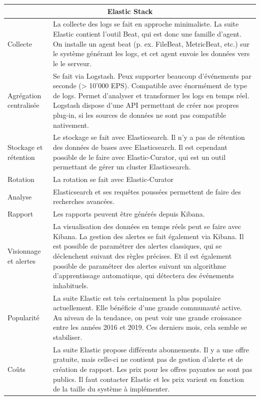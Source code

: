 \documentclass[paper=a4, fontsize=11pt]{scrartcl}
\begin{document}
\centering
\begin{tabular}{ |p{4cm}||p{12cm}|  }
    \hline
    \multicolumn{2}{|c|}{Elastic Stack} \\
    \hline
    Collecte & La collecte des logs se fait en approche minimaliste. La suite Elastic contient l'outil Beat, qui est donc une famille d'agent. On installe un agent beat (p. ex. FileBeat, MetricBeat, etc.) sur le système générant les logs, et cet agent envoie les données vers le le serveur.\\
    \hline
    Agrégation centralisée & Se fait via Logstash. Peux supporter beaucoup d'événements par seconde (> 10'000 EPS). Compatible avec énormément de type de logs. Permet d'analyser et transformer les logs en temps réel. Logstash dispose d'une API permettant de créer nos propres plug-in, si les sources de données ne sont pas compatible nativement.\\
    \hline
    Stockage et rétention & Le stockage se fait avec Elasticsearch. Il n'y a pas de rétention des données de bases avec Elasticsearch. Il est cependant possible de le faire avec Elastic-Curator, qui est un outil permettant de gérer un cluster Elasticsearch.\\
    \hline
    Rotation & La rotation se fait avec Elastic-Curator\\
    \hline
    Analyse & Elasticsearch et ses requêtes poussées permettent de faire des recherches avancées.\\
    \hline
    Rapport & Les rapports peuvent être générés depuis Kibana.\\
    \hline
    Visionnage et alertes & La visualisation des données en temps réels peut se faire avec Kibana. La gestion des alertes se fait également via Kibana. Il est possible de paramétrer des alertes classiques, qui se déclenchent suivant des règles précises. Et il est également possible de paramétrer des alertes suivant un algorithme d'apprentissage automatique, qui détectera des événements inhabituels.\\
    \hline
    Popularité & La suite Elastic est très certainement la plus populaire actuellement. Elle bénéficie d'une grande communauté active. Au niveau de la tendance, on peut voir une grande croissance entre les années 2016 et 2019. Ces derniers mois, cela semble se stabiliser.\\
    \hline
    Coûts &  La suite Elastic propose différents abonnements. Il y a une offre gratuite, mais celle-ci ne contient pas de gestion d'alerte et de création de rapport. Les prix pour les offres payantes ne sont pas publics. Il faut contacter Elastic et les prix varient en fonction de la taille du système à implémenter.\\
    \hline
\end{tabular}
\justify
\end{document}
